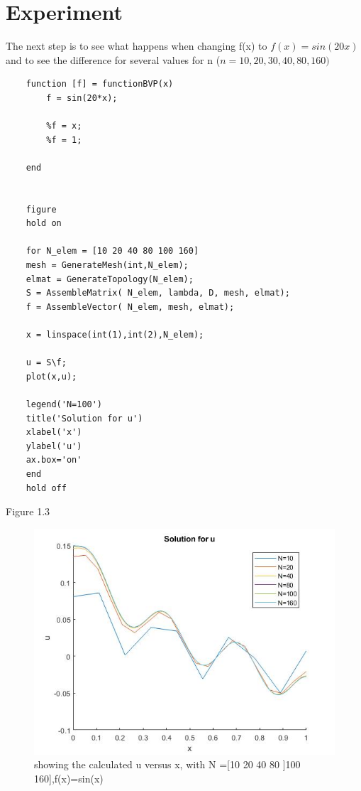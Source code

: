 \documentclass[a4paper]{report}
\begin{document}
\vfill
\section{Experiment}

The next step is to see what happens when changing f(x) to $f(x)=sin(20x)$ and to see the difference for several values for n ($n=10,20,30,40,80,160)$ 

\vspace{5mm}
\begin{lstlisting}
	function [f] = functionBVP(x)
		f = sin(20*x);
	
		%f = x;
		%f = 1;
	
	end
	
	
	figure 
	hold on
	
	for N_elem = [10 20 40 80 100 160]
	mesh = GenerateMesh(int,N_elem);
	elmat = GenerateTopology(N_elem);
	S = AssembleMatrix( N_elem, lambda, D, mesh, elmat);
	f = AssembleVector( N_elem, mesh, elmat);
	
	x = linspace(int(1),int(2),N_elem);
	
	u = S\f;
	plot(x,u);
	
	legend('N=100')
	title('Solution for u')
	xlabel('x')
	ylabel('u')
	ax.box='on'
	end
	hold off
\end{lstlisting}

\newpage

Figure 1.3

\begin{figure}[ht!]
	\centering
	\includegraphics[width=150mm]{1Dfsinx.jpg}
	\caption{showing the calculated u versus x, with N =[10 20 40 80 ]100 160],f(x)=sin(x) \label{overflow}}
\end{figure}
\end{document}
